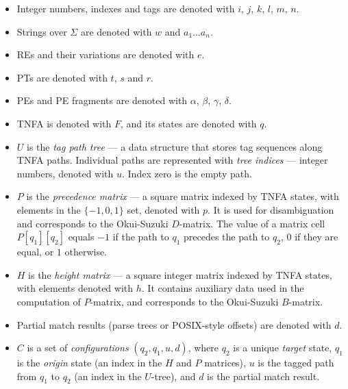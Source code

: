 \documentclass[AMA,STIX1COL]{WileyNJD-v2}
\begin{document}
\begin{itemize}[itemsep=0.2em, topsep=0.5em]
    \item Integer numbers, indexes and tags are denoted with $i$, $j$, $k$, $l$, $m$, $n$.

    \item Strings over $\Sigma$ are denoted with $w$ and $a_1 \hdots a_n$.

    \item REs and their variations are denoted with $e$.

    \item PTs are denoted with $t$, $s$ and $r$.

    \item PEs and PE fragments are denoted with $\alpha$, $\beta$, $\gamma$, $\delta$.

    \item TNFA is denoted with $F$, and its states are denoted with $q$.

    \item $U$ is the \emph{tag path tree} --- a data structure that stores tag sequences along TNFA paths.
        Individual paths are represented with \emph{tree indices} --- integer numbers, denoted with $u$.
        Index zero is the empty path.

    \item $P$ is the \emph{precedence matrix} --- a square matrix indexed by TNFA states,
        with elements in the $\{-1, 0, 1\}$ set, denoted with $p$.
        It is used for disambiguation and corresponds to the Okui-Suzuki $D$-matrix.
        The value of a matrix cell $P[q_1][q_2]$ equals $-1$ if the path to $q_1$
        precedes the path to $q_2$, $0$ if they are equal, or $1$ otherwise.

    \item $H$ is the \emph{height matrix} --- a square integer matrix indexed by TNFA states,
        with elements denoted with $h$.
        It contains auxiliary data used in the computation of $P$-matrix,
        and corresponds to the Okui-Suzuki $B$-matrix.

    \item Partial match results (parse trees or POSIX-style offsets) are denoted with $d$.

    \item $C$ is a set of \emph{configurations} $(q_2, q_1, u, d)$,
        where $q_2$ is a unique \emph{target} state,
        $q_1$ is the \emph{origin} state (an index in the $H$ and $P$ matrices),
        $u$ is the tagged path from $q_1$ to $q_2$ (an index in the $U$-tree),
        and $d$ is the partial match result.


\end{itemize}
\end{document}
